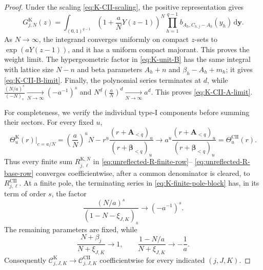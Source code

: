 \documentclass[10pt]{amsart}
\newcommand{\dd}{\,\mathrm d}
\newcommand{\A}{\boldsymbol A}
\newcommand{\bbeta}{\boldsymbol\beta}
\newcommand{\fall}[2]{#1^{\underline{#2}}}
\theoremstyle{plain}
\theoremstyle{definition}
\theoremstyle{remark}
\begin{document}
\begin{proof}
Under the scaling \eqref{eq:K-CII-scaling}, the positive representation gives
\[
 G_{j,N}^{\mathrm K}(z)
 =
 \int_{(0,1)^{q-1}}
 \left(1+\frac aN Y(z-1)\right)^N
 \prod_{h=1}^{q-1}b_{A_h,C_{h,j}-A_h}(y_h)\dd\boldsymbol y.
\]
As \(N\to\infty\), the integrand converges uniformly on compact \(z\)-sets to
\(\exp(aY(z-1))\), and it has a uniform compact majorant. This proves the
weight limit. The hypergeometric factor in \eqref{eq:K-unit-B} has the same
integral with lattice size \(N-n\) and beta parameters
\(A_h+n\) and \(\beta_h-A_h+m_h\); it gives
\eqref{eq:K-CII-B-limit}. Finally, the polynomial series terminates at
\(d\), while
\(\frac{(N/a)^s}{(-N)_s}\xrightarrow[N\to\infty]{}(-a^{-1})^s\) and
\(\fall{N}{d}\left(\frac aN\right)^d\xrightarrow[N\to\infty]{}a^d\).
This proves \eqref{eq:K-CII-A-limit}.

For completeness, we verify the individual type-I components before
summing their sectors.  For every fixed \(u\),
\[
 \Theta_u^{\mathrm K}(r)\big|_{c=a/N}
 =\left(\frac aN\right)^u\fall{N-r}{u}
   \frac{(r+\A_{<q})_u}{(r+\bbeta_{<q})_u}
 \longrightarrow
 a^u\frac{(r+\A_{<q})_u}{(r+\bbeta_{<q})_u}
 =\Theta_u^{\mathrm{CII}}(r).
\]
Thus every finite sum
\(R_{j,\ell}^{\mathrm K,N}\) in
\eqref{eq:unreflected-R-finite-row}--
\eqref{eq:unreflected-R-base-row} converges coefficientwise, after a
common denominator is cleared, to \(R_{j,\ell}^{\mathrm{CII}}\).
At a finite pole, the terminating series in
\eqref{eq:K-finite-pole-block} has, in its term of order \(s\), the
factor
\[
 \frac{(N/a)^s}{(1-N-\xi_{J,K})_s}\longrightarrow(-a^{-1})^s.
\]
The remaining parameters are fixed, while
\[
 \frac{N+\beta_j}{N+\xi_{J,K}}\longrightarrow1,
 \qquad
 \frac{1-N/a}{N+\xi_{J,K}}\longrightarrow-\frac1a.
\]
Consequently
\(\mathcal C_{j,J,K}^{\mathrm K}\to
\mathcal C_{j,J,K}^{\mathrm{CII}}\) coefficientwise for every indicated
\((j,J,K)\).


\end{proof}
\end{document}
